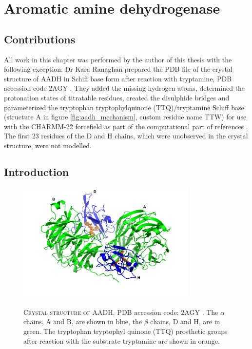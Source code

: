 %
%

\chapter{Aromatic amine dehydrogenase}
\label{chap:aadh}

\section*{Contributions}\label{sec:aadh_contributions}
All work in this chapter was performed by the author of this thesis with the following exception. Dr Kara Ranaghan prepared the PDB file of the crystal structure of AADH in Schiff base form after reaction with tryptamine, PDB accession code 2AGY \cite{masgrauAtomicDescriptionEnzyme2006}. They added the missing hydrogen atoms, determined the protonation states of titratable residues, created the disulphide bridges and parameterized the tryptophan tryptophylquinone (TTQ)/tryptamine Schiff base (structure A in figure \ref{fig:aadh_mechanism}, custom residue name TTW) for use with the CHARMM-22 forcefield \cite{admackerellAllAtomEmpiricalPotential1998} as part of the computational part of references \cite{masgrauAtomicDescriptionEnzyme2006, masgrauTunnelingClassicalPaths2007, ranaghanInitioQMMM2017}.  The first 23 residues of the D and H chains, which were unobserved in the crystal structure, were not modelled.

\section{Introduction}
\begin{figure}
    \centering
    \caption[Crystal structure of AADH]{\textsc{Crystal structure of AADH}. PDB accession code: 2AGY \cite{masgrauAtomicDescriptionEnzyme2006}. The $\alpha$ chains, A and B, are shown in blue, the $\beta$ chains, D and H, are in green. The tryptophan tryptophyl quinone (TTQ) prosthetic groups after reaction with the substrate tryptamine are shown in orange.}
    \includegraphics[width=0.8\textwidth]{chapters/aadh/figures/aadh_full_structure.png}
    \label{fig:aadh_full_structure}
\end{figure}


